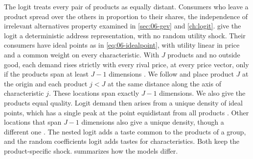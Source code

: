 The logit treats every pair of products as equally distant. Consumers who leave a product spread over the
others in proportion to their shares, the independence of irrelevant alternatives property examined in
\cref{sec:06-gev} and \cref{ch:logit}. \citet{AndersonDePalmaThisse1989} give the logit a deterministic address
representation, with no random utility shock. Their consumers have ideal points as in \eqref{eq:06-idealpoint}, with
utility linear in price and a common weight on every characteristic. With $J$ products and no outside good, each
demand rises strictly with every rival price, at every price vector, only if the products span at least $J-1$
dimensions \citep[Proposition~1]{AndersonDePalmaThisse1989}. We follow \citet{AndersonDePalmaThisse1989} and place
product $J$ at the origin and each product $j<J$ at the same distance along the axis of characteristic $j$. These
locations span exactly $J-1$ dimensions. We also give the products equal quality. Logit demand then arises from a
unique density of ideal points, which has a single peak at the point equidistant from all products
\citep[Propositions~2 and~4]{AndersonDePalmaThisse1989}. Other locations that span $J-1$ dimensions also give a
unique density, though a different one \citep[p.~26]{AndersonDePalmaThisse1989}.
The nested logit adds a taste common to the products of a group, and the random coefficients logit adds
tastes for characteristics. Both keep the product-specific shock.  summarizes how
the models differ.

